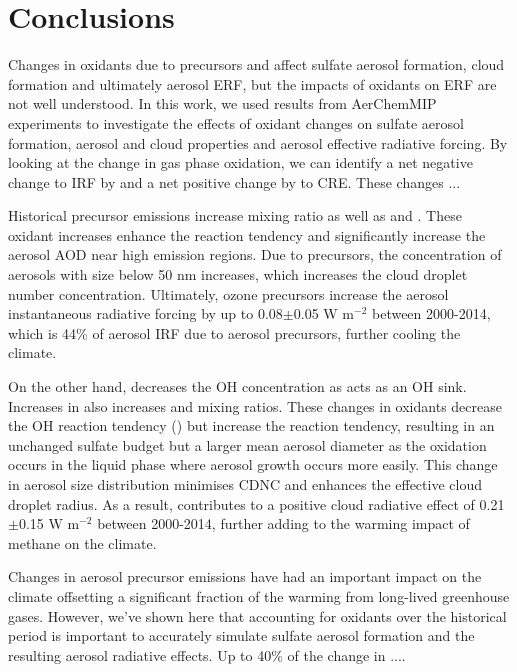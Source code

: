


\section{Conclusions}

Changes in oxidants due to  precursors and  affect sulfate aerosol formation, cloud formation and ultimately aerosol ERF, but the impacts of oxidants on ERF are not well understood. In this work, we used results from AerChemMIP experiments to investigate the effects of oxidant changes on sulfate aerosol formation, aerosol and cloud properties and aerosol effective radiative forcing. By looking at the change in gas phase oxidation, we can identify a net negative change to IRF by  and a net positive change by  to CRE. These changes ... 

Historical  precursor emissions increase  mixing ratio as well as  and . These oxidant increases enhance the  reaction tendency and significantly increase the aerosol AOD near high  emission regions.  Due to  precursors, the concentration of aerosols with size below 50 nm increases, which increases the cloud droplet number concentration. Ultimately, ozone precursors increase the aerosol instantaneous radiative forcing by up to 0.08$\pm$0.05 W m$^{-2}$ between 2000-2014, which is 44\% of aerosol IRF due to aerosol precursors, further cooling the climate.

On the other hand,  decreases the OH concentration as  acts as an OH sink. Increases in  also increases  and  mixing ratios. These changes in oxidants decrease the OH reaction tendency () but increase the  reaction tendency, resulting in an unchanged sulfate budget but a larger mean aerosol diameter as the  oxidation occurs in the liquid phase where aerosol growth occurs more easily. This change in aerosol size distribution minimises CDNC and enhances the effective cloud droplet radius. As a result, contributes to a positive cloud radiative effect of 0.21$\pm$0.15 W m$^{-2}$ between 2000-2014, further adding to the warming impact of methane on the climate.

Changes in aerosol precursor emissions have had an important impact on the climate offsetting a significant fraction of the warming from long-lived greenhouse gases. However, we've shown here that accounting for oxidants over the historical period is important to accurately simulate sulfate aerosol formation and the resulting aerosol radiative effects. Up to 40\% of the change in ....  
